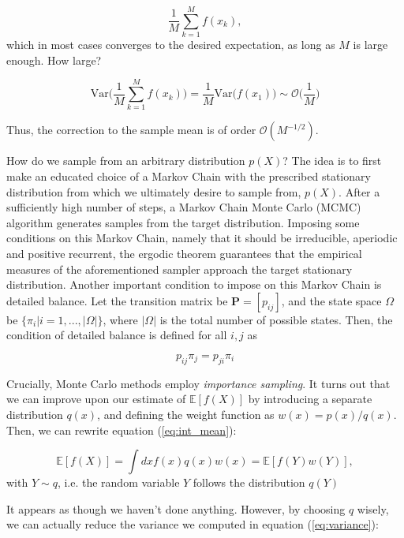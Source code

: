 \documentclass[10pt, twocolumn, twoside]{article}
\begin{document}
\begin{equation}
\frac{1}{M} \sum_{k=1}^M f (x_k) , 
\end{equation}
which in most cases converges to the desired expectation, as long as $M$ is large enough. How large?

\begin{equation}\label{eq:variance}
\text{Var}\bigg( \frac{1}{M} \sum_{k=1}^M f(x_k) \bigg) = \frac{1}{M} \text{Var}\bigg( f(x_1) \bigg) \sim \mathcal{O}\bigg(\frac{1}{M}\bigg)
\end{equation}

Thus, the correction to the sample mean is of order $\mathcal{O}(M^{-1/2})$.

How do we sample from an arbitrary distribution $p(X)$? The idea is to first make an educated choice of a Markov Chain with the prescribed stationary distribution from which we ultimately desire to sample from, $p(X)$. After a sufficiently high number of steps, a Markov Chain Monte Carlo (MCMC) algorithm generates samples from the target distribution. Imposing some conditions on this Markov Chain, namely that it should be irreducible, aperiodic and positive recurrent, the ergodic theorem guarantees that the empirical measures of the aforementioned sampler approach the target stationary distribution. Another important condition to impose on this Markov Chain is detailed balance. Let the transition matrix be $\bm P = [p_{ij}]$, and the state space $\Omega$ be $\{\pi_i | i=1, ..., |\Omega| \}$, where $|\Omega|$ is the total number of possible states. Then, the condition of detailed balance is defined for all $i, j$ as

\begin{equation}
p_{ij} \pi_j = p_{ji} \pi_i
\end{equation}

Crucially, Monte Carlo methods employ \emph{importance sampling}. It turns out that we can improve upon our estimate of $\mathbb{E} [f(X)]$ by introducing a separate distribution $q(x)$, and defining the weight function as $w(x) = p(x)/ q(x)$. Then, we can rewrite equation (\ref{eq:int_mean}):

\begin{equation}
\mathbb{E} [f(X)] = \int dx f(x) q(x) w(x) = \mathbb{E} [f(Y) w(Y)],
\end{equation}
with $Y \sim q$, i.e. the random variable $Y$ follows the distribution $q(Y)$

It appears as though we haven't done anything. However, by choosing $q$ wisely, we can actually reduce the variance we computed in equation (\ref{eq:variance}):
\end{document}
